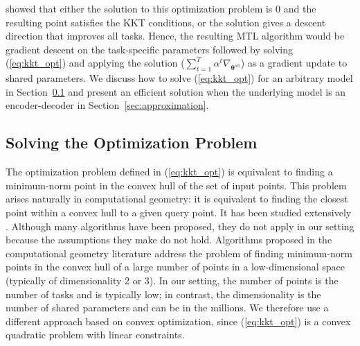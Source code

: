 \documentclass{article}
\def\btheta{{\bm\theta}}
\begin{document}
\citet{Desideri2012} showed that either the solution to this optimization problem is $0$ and the resulting point satisfies the KKT conditions, or the solution gives a descent direction that improves all tasks. Hence, the resulting MTL algorithm would be gradient descent on the task-specific parameters followed by solving (\ref{eq:kkt_opt}) and applying the solution ($\sum_{t=1}^T\alpha^t \nabla_{\btheta^{sh}}$) as a gradient update to shared parameters. We discuss how to solve (\ref{eq:kkt_opt}) for an arbitrary model in Section~\ref{sec:optimization} and present an efficient solution when the underlying model is an encoder-decoder in Section~\ref{sec:approximation}.

\subsection{Solving the Optimization Problem}
\label{sec:optimization}

The optimization problem defined in (\ref{eq:kkt_opt}) is equivalent to finding a minimum-norm point in the convex hull of the set of input points. This problem arises naturally in computational geometry: it is equivalent to finding the closest point within a convex hull to a given query point. It has been studied extensively \citep{Makimoto1994, Wolfe1976, Sekitani1993}. Although many algorithms have been proposed, they do not apply in our setting because the assumptions they make do not hold. Algorithms proposed in the computational geometry literature address the problem of finding minimum-norm points in the convex hull of a large number of points in a low-dimensional space (typically of dimensionality 2 or 3). In our setting, the number of points is the number of tasks and is typically low; in contrast, the dimensionality is the number of shared parameters and can be in the millions. We therefore use a different approach based on convex optimization, since (\ref{eq:kkt_opt}) is a convex quadratic problem with linear constraints.
\end{document}
